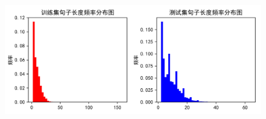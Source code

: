 \documentclass[12pt,a4paper,draft]{ctexart}
\begin{document}
\begin{figure}
	\centering
	\includegraphics[width=1\linewidth]{DataSetHistogram}
	\caption{}
	\label{fig:datasethistogram}
\end{figure}




\printbibliography[heading=bibliography,title=参考文献]
\end{document}
